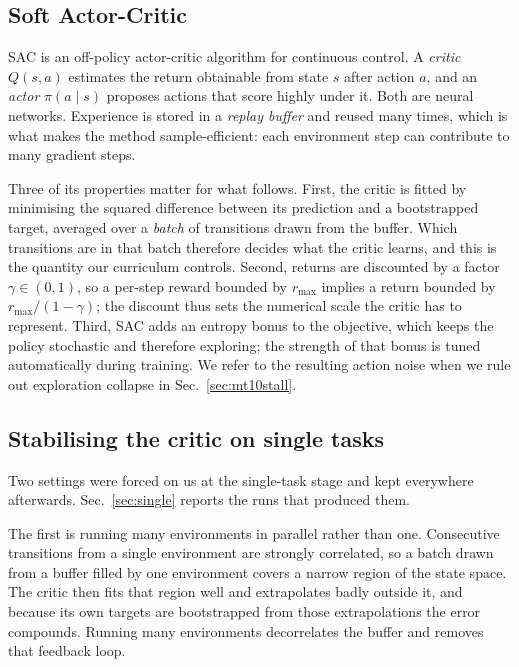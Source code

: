 \documentclass[letterpaper, 10 pt, conference]{ieeeconf}
\begin{document}
\subsection{Soft Actor-Critic}

SAC \cite{haarnoja2018sac} is an off-policy actor-critic algorithm for continuous
control. A \emph{critic} $Q(s,a)$ estimates the return obtainable from state $s$ after action
$a$, and an \emph{actor} $\pi(a \mid s)$ proposes actions that score highly under it. Both are
neural networks. Experience is stored in a \emph{replay buffer} and reused many times, which
is what makes the method sample-efficient: each environment step can contribute to many
gradient steps.

Three of its properties matter for what follows. First, the critic is fitted by
minimising the squared difference between its prediction and a bootstrapped target, averaged
over a \emph{batch} of transitions drawn from the buffer. Which transitions are in that batch
therefore decides what the critic learns, and this is the quantity our curriculum controls.
Second, returns are discounted by a factor $\gamma \in (0,1)$, so a per-step reward bounded by
$r_{\max}$ implies a return bounded by $r_{\max}/(1-\gamma)$; the discount thus sets the
numerical scale the critic has to represent. Third, SAC adds an entropy bonus to the
objective, which keeps the policy stochastic and therefore exploring; the strength of that
bonus is tuned automatically during training. We refer to the resulting action noise when we
rule out exploration collapse in Sec.~\ref{sec:mt10stall}.

\subsection{Stabilising the critic on single tasks}
\label{sec:critic}

Two settings were forced on us at the single-task stage and kept everywhere afterwards.
Sec.~\ref{sec:single} reports the runs that produced them.

The first is running many environments in parallel rather than one. Consecutive
transitions from a single environment are strongly correlated, so a batch drawn from a buffer
filled by one environment covers a narrow region of the state space. The critic then fits that
region well and extrapolates badly outside it, and because its own targets are bootstrapped
from those extrapolations the error compounds. Running many environments decorrelates the
buffer and removes that feedback loop.
\end{document}
